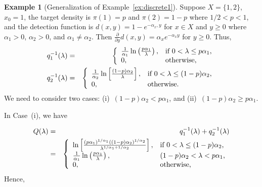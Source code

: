 \documentclass[12pt]{article}
\theoremstyle{plain}
\theoremstyle{definition}
\newtheorem{example}{Example}%
\theoremstyle{remark}
\begin{document}
\begin{example}[Generalization of Example~\ref{ex:discrete1}]
\label{ex:counterdiscrete}
Suppose $X=\{1, 2\}$,  {\color{blue}$x_0=1$,} the target density is $\pi(1)=p$ and $\pi(2)=1-p$ where $1/2<p<1$,  and the detection function is $d(x, y)=1-e^{-\alpha_x, y}$ for $x\in X$ and $y\geq 0$ where $\alpha_1>0$, $\alpha_2>0$, and $\alpha_1\neq\alpha_2$.  Then $\frac{\partial }{\partial y}d(x, y)=\alpha_x e^{-\alpha_x y}$ for $y\geq 0$. Thus, 
\begin{eqnarray*}
q_1^{-1}(\lambda)&=&\left\{
		                           \begin{array}{ll}
		                           \frac{1}{\alpha_1}\ln \left(\frac{p\alpha_1}{\lambda}\right),& \hbox{if $0<\lambda\leq p\alpha_1$,} \\
					0, & \hbox{otherwise,}
		                          \end{array}
		                         \right.		\\
q_2^{-1}(\lambda)&=&\left\{
		                           \begin{array}{ll}
		                           \frac{1}{\alpha_2}\ln \left[\frac{(1-p)\alpha_2}{\lambda}\right],& \hbox{if $0<\lambda\leq (1-p)\alpha_2$,} \\
					0, & \hbox{otherwise.}
		                          \end{array}
		                         \right.		
\end{eqnarray*}
We need to consider two cases: (i)~$(1-p)\alpha_2<  p\alpha_1$, and (ii)~$(1-p)\alpha_2\geq  p\alpha_1$.

In Case~(i), we have 

\begin{eqnarray*}
Q(\lambda) &=& q_1^{-1}(\lambda) +q_2^{-1}(\lambda)  \\
		 &=& \left\{
		                           \begin{array}{ll}
		                           \ln\left[\frac{(p\alpha_1)^{1/\alpha_1}((1-p)\alpha_2)^{1/\alpha_2}}{\lambda^{1/\alpha_1+1/\alpha_2}}\right],& \hbox{if $0<\lambda\leq (1-p)\alpha_2$,} \\
					\frac{1}{\alpha_1}\ln \left(\frac{p\alpha_1}{\lambda}\right), & \hbox{$(1-p)\alpha_2<\lambda<p\alpha_1$,} \\
					0, & \hbox{otherwise,}
		                          \end{array}
		                         \right.
\end{eqnarray*}
Hence, 



\end{example}
\end{document}
